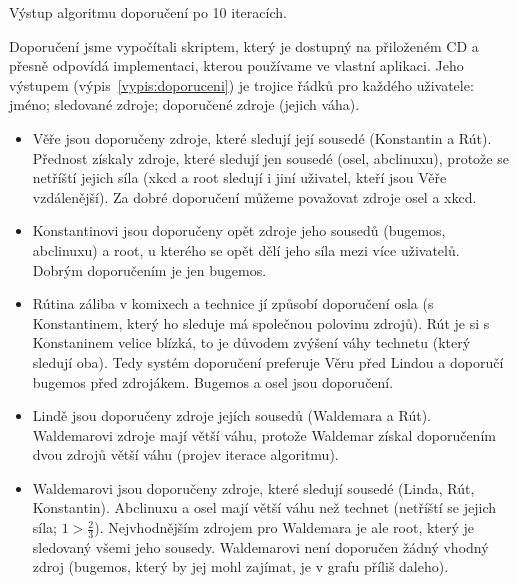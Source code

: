 \begin{vypis}
	
	\caption{Výstup algoritmu doporučení po 10 iteracích.}
	\label{vypis:doporuceni}
\end{vypis}

Doporučení jsme vypočítali skriptem, který je dostupný na přiloženém CD a přesně odpovídá implementaci, kterou používame ve vlastní aplikaci.
Jeho výstupem (výpis~\ref{vypis:doporuceni}) je trojice řádků pro každého uživatele: jméno; sledované zdroje; doporučené zdroje (jejich váha).

\begin{itemize}
	\item Věře jsou doporučeny zdroje, které sledují její sousedé (Konstantin a Rút).
		Přednost získaly zdroje, které sledují jen sousedé (osel, abclinuxu), protože se netříští jejich síla (xkcd a root sledují i jiní uživatel, kteří jsou Věře vzdálenější).
		Za dobré doporučení můžeme považovat zdroje osel a xkcd.
	\item Konstantinovi jsou doporučeny opět zdroje jeho sousedů (bugemos, abclinuxu) a root, u kterého se opět dělí jeho síla mezi více uživatelů.
		Dobrým doporučením je jen bugemos.
	\item Rútina záliba v komixech a technice jí způsobí doporučení osla (s Konstantinem, který ho sleduje má společnou polovinu zdrojů).
		Rút je si s Konstaninem velice blízká, to je důvodem zvýšení váhy technetu (který sledují oba).
		Tedy systém doporučení preferuje Věru před Lindou a doporučí bugemos před zdrojákem.
		Bugemos a osel jsou doporučení.
	\item Lindě jsou doporučeny zdroje jejích sousedů (Waldemara a Rút).
		Waldemarovi zdroje mají větší váhu, protože Waldemar získal doporučením dvou zdrojů větší váhu (projev iterace algoritmu).
	\item Waldemarovi jsou doporučeny zdroje, které sledují sousedé (Linda, Rút, Konstantin). Abclinuxu a osel mají větší váhu než technet (netříští se jejich síla; $1 > \tfrac{2}{3}$).
		Nejvhodnějším zdrojem pro Waldemara je ale root, který je sledovaný všemi jeho sousedy.
		Waldemarovi není doporučen žádný vhodný zdroj (bugemos, který by jej mohl zajímat, je v grafu příliš daleho).
\end{itemize}
